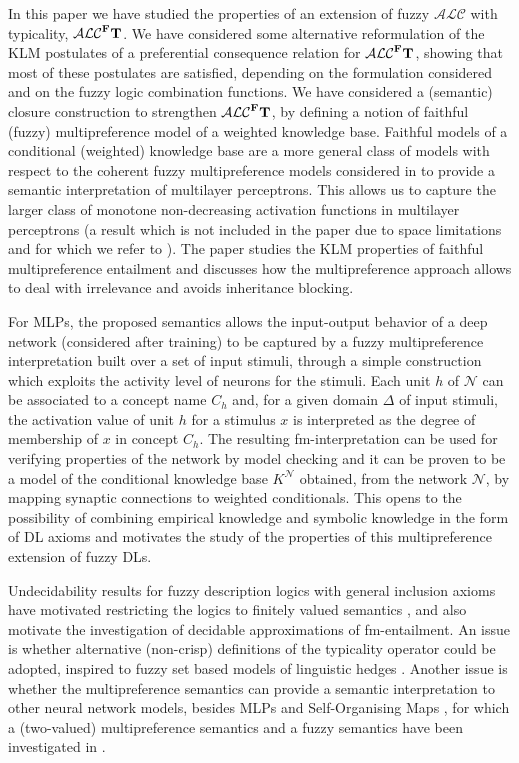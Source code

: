 \documentclass[runningheads]{llncs}
\newcommand {\enne} {\mathcal{N}}
\newcommand{\tip}{{\bf T}}
\newcommand{\alc}{\mathcal{ALC}}
\newcommand{\alcFt}{\mathcal{ALC}^{\Fe}\tip}
\newcommand {\Fe} {{\bf F}}
\begin{document}
In this paper we have studied the properties of an extension of fuzzy $\alc$ with typicality, $\alcFt$. We have considered some alternative reformulation of the KLM postulates of a preferential consequence relation for $\alcFt$, showing that most of these postulates are satisfied, depending on the formulation considered and on the fuzzy logic combination functions.
We have considered a (semantic) closure construction to strengthen $\alcFt$,  by defining a notion of faithful (fuzzy) multipreference model of a weighted knowledge base. Faithful models of a conditional (weighted) knowledge base are a more general class 
of models with respect to the coherent fuzzy multipreference models considered in \cite{JELIA2021} to provide a semantic interpretation of multilayer perceptrons. 
This allows us to capture the larger class of monotone non-decreasing activation functions in multilayer perceptrons (a result which is not included in the paper due to space limitations and for which we refer to \cite{arXiv_JELIA2020}). The paper studies the KLM properties of faithful multipreference entailment 
and discusses how the multipreference approach allows to deal with irrelevance and avoids inheritance blocking.


For MLPs, the proposed semantics allows the input-output behavior of a deep network (considered after training) to be captured by a fuzzy multipreference interpretation built over a set of input stimuli, through a simple construction which exploits the activity level of neurons for the stimuli. 
Each unit $h$ of $\enne$ can be associated to a concept name $C_h$ and,
for a given domain $\Delta$ of input stimuli, the activation value of unit $h$ for a stimulus $x$ is interpreted as the degree of membership of $x$ in concept $C_h$. 
The resulting fm-interpretation can be used for verifying properties of the network by model checking and it can be proven \cite{JELIA2021} to be a model of the conditional knowledge base $K^{\enne}$ obtained, from the network $\enne$,  by mapping synaptic connections to weighted conditionals.
This opens to the possibility 
of combining empirical knowledge and symbolic knowledge in the form of DL axioms  and motivates the study of the properties of this  
multipreference extension of fuzzy DLs. 


Undecidability results for fuzzy description logics with general inclusion axioms 
\cite{BaaderPenaloza11,CeramiStraccia2011,BorgwardtPenaloza12} 
have motivated restricting the logics to finitely valued semantics \cite{BorgwardtPenaloza13}, 
and also motivate the investigation of decidable approximations of fm-entailment.   
An issue is whether alternative (non-crisp) definitions of the typicality operator could be adopted, inspired to fuzzy set based models of linguistic hedges \cite{HuynhHN02}. 
Another issue is whether the multipreference semantics can provide a semantic interpretation to other neural network models, besides
MLPs and 
Self-Organising Maps  \cite{kohonen2001}, for which a (two-valued) multipreference semantics and a fuzzy semantics have been 
investigated in  \cite{CILC2020}.
\end{document}
